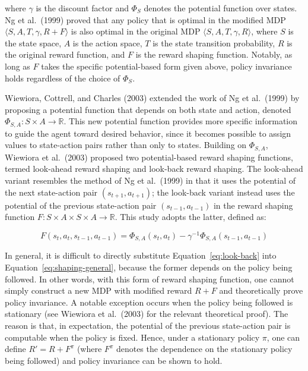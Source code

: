 where $\gamma$ is the discount factor and $\Phi_S$ denotes the potential function over states. Ng et al.\ (1999) proved that any policy that is optimal in the modified MDP $\langle S, A, T, \gamma, R+F \rangle$ is also optimal in the original MDP $\langle S, A, T, \gamma, R \rangle$, where $S$ is the state space, $A$ is the action space, $T$ is the state transition probability, $R$ is the original reward function, and $F$ is the reward shaping function. Notably, as long as $F$ takes the specific potential-based form given above, policy invariance holds regardless of the choice of $\Phi_S$.

Wiewiora, Cottrell, and Charles (2003) extended the work of Ng et al.\ (1999) by proposing a potential function that depends on both state and action, denoted $\Phi_{S,A}: S \times A \rightarrow \mathbb{R}$. This new potential function provides more specific information to guide the agent toward desired behavior, since it becomes possible to assign values to state-action pairs rather than only to states. Building on $\Phi_{S,A}$, Wiewiora et al.\ (2003) proposed two potential-based reward shaping functions, termed look-ahead reward shaping and look-back reward shaping. The look-ahead variant resembles the method of Ng et al.\ (1999) in that it uses the potential of the next state-action pair $(s_{t+1}, a_{t+1})$; the look-back variant instead uses the potential of the previous state-action pair $(s_{t-1}, a_{t-1})$ in the reward shaping function $F: S \times A \times S \times A \rightarrow \mathbb{R}$. This study adopts the latter, defined as:

\begin{equation}
F(s_t, a_t, s_{t-1}, a_{t-1}) = \Phi_{S,A}(s_t, a_t) - \gamma^{-1} \Phi_{S,A}(s_{t-1}, a_{t-1}) \label{eq:look-back}
\end{equation}

In general, it is difficult to directly substitute Equation~\eqref{eq:look-back} into Equation~\eqref{eq:shaping-general}, because the former depends on the policy being followed. In other words, with this form of reward shaping function, one cannot simply construct a new MDP with modified reward $R+F$ and theoretically prove policy invariance. A notable exception occurs when the policy being followed is stationary (see Wiewiora et al.\ (2003) for the relevant theoretical proof). The reason is that, in expectation, the potential of the previous state-action pair is computable when the policy is fixed. Hence, under a stationary policy $\pi$, one can define $R' = R + F^{\pi}$ (where $F^{\pi}$ denotes the dependence on the stationary policy being followed) and policy invariance can be shown to hold.

